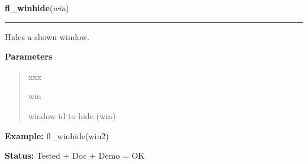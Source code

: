 \hspace{.8\funcindent}\begin{boxedminipage}{\funcwidth}

    \raggedright \textbf{fl\_winhide}(\textit{win})

    \vspace{-1.5ex}

    \rule{\textwidth}{0.5\fboxrule}
\setlength{\parskip}{2ex}
    Hides a shown window.

\setlength{\parskip}{1ex}
      \textbf{Parameters}
      \vspace{-1ex}

      \begin{quote}
        \begin{Ventry}{xxx}

          \item[win]

          window id to hide (win)

        \end{Ventry}

      \end{quote}

\textbf{Example:} fl\_winhide(win2)



\textbf{Status:} Tested + Doc + Demo = OK



    \end{boxedminipage}

    \label{xformslib:flxbasic:fl_winclose}

    \vspace{0.5ex}

